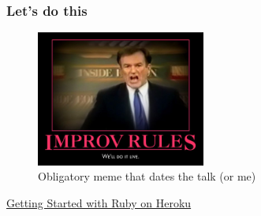 \documentclass{beamer}
\begin{document}
\begin{frame}[fragile]
  \frametitle{Let's do this}

   \begin{figure}[p]
    \centering
    \includegraphics[width=15em]{well-do-it-live.jpg}
    \caption{Obligatory meme that dates the talk (or me)}
  \end{figure}

  \href{https://devcenter.heroku.com/articles/getting-started-with-ruby#introduction}{Getting Started with Ruby on Heroku}
  
\end{frame}
\end{document}
